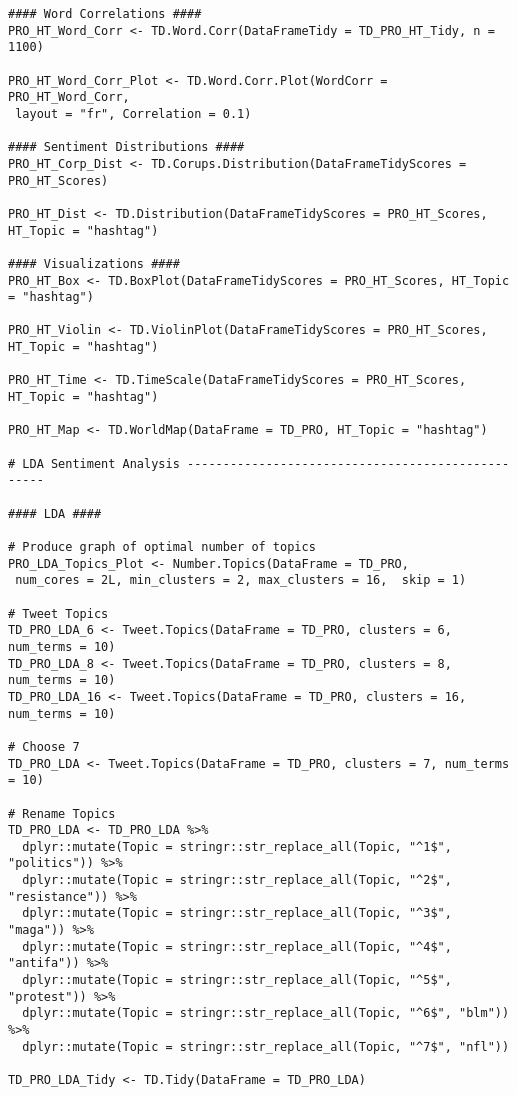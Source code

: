 \begin{lstlisting}
#### Word Correlations ####
PRO_HT_Word_Corr <- TD.Word.Corr(DataFrameTidy = TD_PRO_HT_Tidy, n = 1100)

PRO_HT_Word_Corr_Plot <- TD.Word.Corr.Plot(WordCorr = PRO_HT_Word_Corr, 
 layout = "fr", Correlation = 0.1)

#### Sentiment Distributions ####
PRO_HT_Corp_Dist <- TD.Corups.Distribution(DataFrameTidyScores = PRO_HT_Scores)

PRO_HT_Dist <- TD.Distribution(DataFrameTidyScores = PRO_HT_Scores, HT_Topic = "hashtag")

#### Visualizations ####
PRO_HT_Box <- TD.BoxPlot(DataFrameTidyScores = PRO_HT_Scores, HT_Topic = "hashtag")

PRO_HT_Violin <- TD.ViolinPlot(DataFrameTidyScores = PRO_HT_Scores, HT_Topic = "hashtag")

PRO_HT_Time <- TD.TimeScale(DataFrameTidyScores = PRO_HT_Scores, HT_Topic = "hashtag")

PRO_HT_Map <- TD.WorldMap(DataFrame = TD_PRO, HT_Topic = "hashtag")

# LDA Sentiment Analysis --------------------------------------------------

#### LDA ####

# Produce graph of optimal number of topics
PRO_LDA_Topics_Plot <- Number.Topics(DataFrame = TD_PRO, 
 num_cores = 2L, min_clusters = 2, max_clusters = 16,  skip = 1)

# Tweet Topics
TD_PRO_LDA_6 <- Tweet.Topics(DataFrame = TD_PRO, clusters = 6, num_terms = 10)
TD_PRO_LDA_8 <- Tweet.Topics(DataFrame = TD_PRO, clusters = 8, num_terms = 10)
TD_PRO_LDA_16 <- Tweet.Topics(DataFrame = TD_PRO, clusters = 16, num_terms = 10)

# Choose 7
TD_PRO_LDA <- Tweet.Topics(DataFrame = TD_PRO, clusters = 7, num_terms = 10)

# Rename Topics
TD_PRO_LDA <- TD_PRO_LDA %>% 
  dplyr::mutate(Topic = stringr::str_replace_all(Topic, "^1$", "politics")) %>% 
  dplyr::mutate(Topic = stringr::str_replace_all(Topic, "^2$", "resistance")) %>% 
  dplyr::mutate(Topic = stringr::str_replace_all(Topic, "^3$", "maga")) %>% 
  dplyr::mutate(Topic = stringr::str_replace_all(Topic, "^4$", "antifa")) %>% 
  dplyr::mutate(Topic = stringr::str_replace_all(Topic, "^5$", "protest")) %>% 
  dplyr::mutate(Topic = stringr::str_replace_all(Topic, "^6$", "blm")) %>% 
  dplyr::mutate(Topic = stringr::str_replace_all(Topic, "^7$", "nfl"))

TD_PRO_LDA_Tidy <- TD.Tidy(DataFrame = TD_PRO_LDA)


\end{lstlisting}
